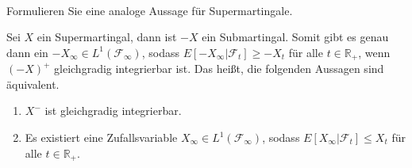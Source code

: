 \documentclass{article}
\begin{document}
\paragraph{}
Formulieren Sie eine analoge Aussage für Supermartingale.

Sei $X$ ein Supermartingal, dann ist $-X$ ein Submartingal.
Somit gibt es genau dann ein $-X_\infty\in L^1(\mathscr{F}_\infty)$, sodass $E[-X_\infty|\mathscr{F}_t]\geq -X_t$ für alle $t\in\mathbb{R}_+$, wenn $(-X)^+$ gleichgradig integrierbar ist.
Das heißt, die folgenden Aussagen sind äquivalent.
\begin{enumerate}
\item $X^-$ ist gleichgradig integrierbar.
\item Es existiert eine Zufallsvariable $X_\infty\in L^1(\mathscr{F}_\infty)$, sodass $E[X_\infty|\mathscr{F}_t]\leq X_t$ für alle $t\in\mathbb{R}_+$.
\end{enumerate}
\end{document}
